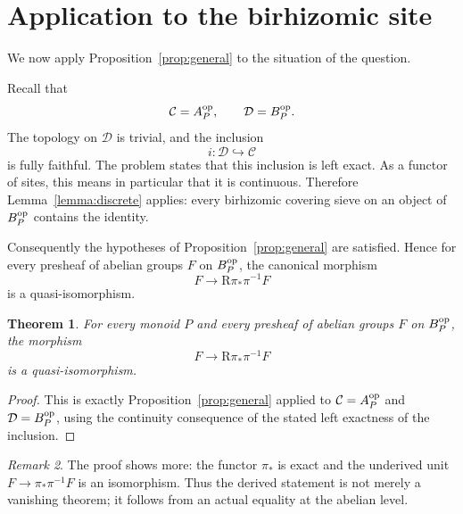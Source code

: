 \documentclass{article}
\newtheorem{theorem}{Theorem}
\theoremstyle{remark}
\newtheorem{remark}[theorem]{Remark}
\begin{document}
\section{Application to the birhizomic site}

We now apply Proposition~\ref{prop:general} to the situation of the
question.

Recall that
\[
\mathcal C=A_P^{\rm op},\qquad \mathcal D=B_P^{\rm op}.
\]
The topology on \(\mathcal D\) is trivial, and the inclusion
\[
i:\mathcal D\hookrightarrow \mathcal C
\]
is fully faithful.  The problem states that this inclusion is left
exact.  As a functor of sites, this means in particular that it is
continuous.  Therefore Lemma~\ref{lemma:discrete} applies: every
birhizomic covering sieve on an object of \(B_P^{\rm op}\) contains the
identity.

Consequently the hypotheses of Proposition~\ref{prop:general} are
satisfied.  Hence for every presheaf of abelian groups \(F\) on
\(B_P^{\rm op}\), the canonical morphism
\[
F\longrightarrow \mathrm R\pi_\ast\pi^{-1}F
\]
is a quasi-isomorphism.

\begin{theorem}
For every monoid \(P\) and every presheaf of abelian groups \(F\) on
\(B_P^{\rm op}\), the morphism
\[
F \longrightarrow \mathrm R\pi_\ast\pi^{-1}F
\]
is a quasi-isomorphism.
\end{theorem}

\begin{proof}
This is exactly Proposition~\ref{prop:general} applied to
\(\mathcal C=A_P^{\rm op}\) and \(\mathcal D=B_P^{\rm op}\), using the
continuity consequence of the stated left exactness of the inclusion.
\end{proof}

\begin{remark}
The proof shows more: the functor \(\pi_\ast\) is exact and the
underived unit \(F\to\pi_\ast\pi^{-1}F\) is an isomorphism.  Thus the
derived statement is not merely a vanishing theorem; it follows from an
actual equality at the abelian level.
\end{remark}
\end{document}
